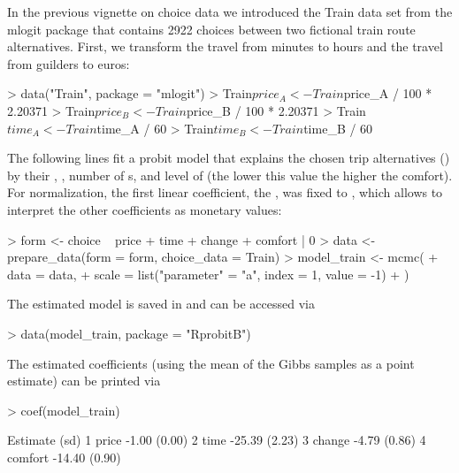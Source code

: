 \documentclass[article]{jss}
\begin{document}
In the previous vignette on choice data we introduced the Train data set from the mlogit package \citep{Croissant:2020} that contains 2922 choices between two fictional train route alternatives. First, we transform the travel  from minutes to hours and the travel  from guilders to euros:

\begin{Schunk}
\begin{Sinput}
> data("Train", package = "mlogit")
> Train$price_A <- Train$price_A / 100 * 2.20371
> Train$price_B <- Train$price_B / 100 * 2.20371
> Train$time_A <- Train$time_A / 60
> Train$time_B <- Train$time_B / 60
\end{Sinput}
\end{Schunk}

The following lines fit a probit model that explains the chosen trip alternatives () by their , , number of  s, and level of  (the lower this value the higher the comfort). For normalization, the first linear coefficient, the , was fixed to , which allows to interpret the other coefficients as monetary values:

\begin{Schunk}
\begin{Sinput}
> form <- choice ~ price + time + change + comfort | 0
> data <- prepare_data(form = form, choice_data = Train)
> model_train <- mcmc(
+    data = data,
+    scale = list("parameter" = "a", index = 1, value = -1)
+  )
\end{Sinput}
\end{Schunk}

The estimated model is saved in  and can be accessed via

\begin{Schunk}
\begin{Sinput}
> data(model_train, package = "RprobitB")
\end{Sinput}
\end{Schunk}

The estimated coefficients (using the mean of the Gibbs samples as a point estimate) can be printed via

\begin{Schunk}
\begin{Sinput}
> coef(model_train)
\end{Sinput}
\begin{Soutput}
           Estimate   (sd)
1   price     -1.00 (0.00)
2    time    -25.39 (2.23)
3  change     -4.79 (0.86)
4 comfort    -14.40 (0.90)
\end{Soutput}
\end{Schunk}
\end{document}
